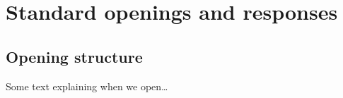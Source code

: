 \chapter{Standard openings and responses}
\label{ch:standard_openings_responses}

\section{Opening structure}

Some text explaining when we open\ldots

%
%
%
%
%

